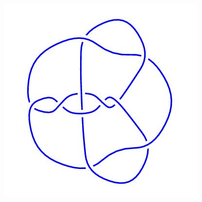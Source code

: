 \begin{figure}[H]
\begin{minipage}[b]{.18\linewidth}
	\end{minipage}
	\begin{minipage}[b]{.18\linewidth}
		\centering
		\includegraphics[width=\linewidth]{../data/10_111.png}
	\end{minipage}
\end{figure}
